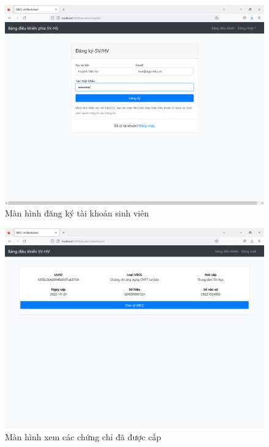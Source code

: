 \begin{figure}[htbp]
\centering
\includegraphics[width=.9\linewidth]{img/std_new.PNG}
\caption{Màn hình đăng ký tài khoản sinh viên}
\label{fig:std_new}
\end{figure}


\begin{figure}[htbp]
\centering
\includegraphics[width=.9\linewidth]{img/sv_hva.PNG}
\caption{Màn hình xem các chứng chỉ đã được cấp}
\label{fig:sv_hva}
\end{figure}

